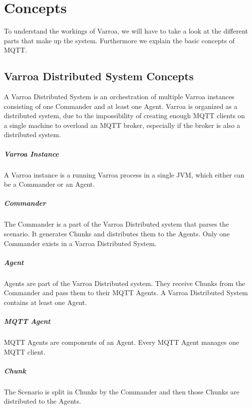 \chapter{Concepts}
To understand the workings of Varroa, we will have to take a look at the different parts that make up the system.
Furthermore we explain the basic concepts of MQTT.

\section{Varroa Distributed System Concepts}
A Varroa Distributed System is an orchestration of multiple Varroa instances consisting of one Commander and at least one Agent.
Varroa is organized as a distributed system, due to the impossibility of creating enough MQTT clients on a single machine to overload an MQTT broker, especially if the broker is also a distributed system.

\paragraph{Varroa Instance}
A Varroa instance is a running Varroa process in a single JVM, which either can be a Commander or an Agent.

\paragraph{Commander}
The Commander is a part of the Varroa Distributed system that parses the scenario.
It generates Chunks and distributes them to the Agents.
Only one Commander exists in a Varroa Distributed System.

\paragraph{Agent}
Agents are part of the Varroa Distributed system.
They receive Chunks from the Commander and pass them to their MQTT Agents.
A Varroa Distributed System contains at least one Agent.

\paragraph{MQTT Agent}
MQTT Agents are components of an Agent.
Every MQTT Agent manages one MQTT client.

\paragraph{Chunk}
The Scenario is split in Chunks by the Commander and then those Chunks are distributed to the Agents.

